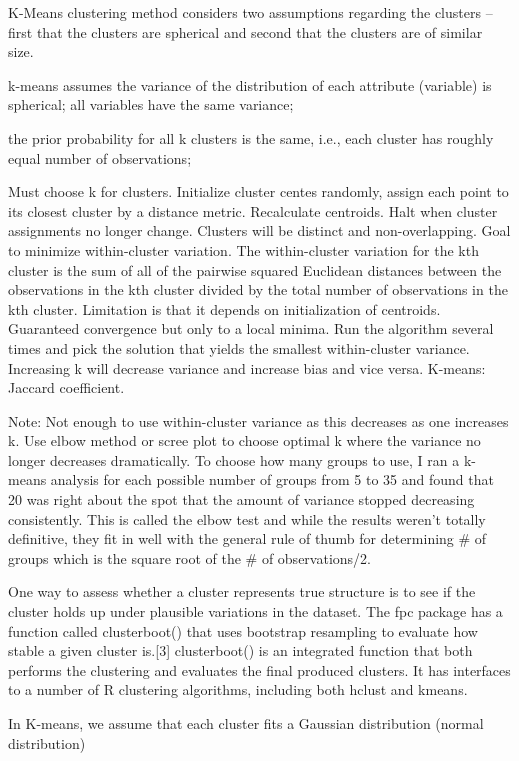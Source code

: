 \documentclass[]{book}
\theoremstyle{definition}
\theoremstyle{definition}
\theoremstyle{definition}
\theoremstyle{remark}
\begin{document}
K-Means clustering method considers two assumptions regarding the
clusters -- first that the clusters are spherical and second that the
clusters are of similar size.

k-means assumes the variance of the distribution of each attribute
(variable) is spherical; all variables have the same variance;

the prior probability for all k clusters is the same, i.e., each cluster
has roughly equal number of observations;

Must choose k for clusters. Initialize cluster centes randomly, assign
each point to its closest cluster by a distance metric. Recalculate
centroids. Halt when cluster assignments no longer change. Clusters will
be distinct and non-overlapping. Goal to minimize within-cluster
variation. The within-cluster variation for the kth cluster is the sum
of all of the pairwise squared Euclidean distances between the
observations in the kth cluster divided by the total number of
observations in the kth cluster. Limitation is that it depends on
initialization of centroids. Guaranteed convergence but only to a local
minima. Run the algorithm several times and pick the solution that
yields the smallest within-cluster variance. Increasing k will decrease
variance and increase bias and vice versa. K-means: Jaccard coefficient.

Note: Not enough to use within-cluster variance as this decreases as one
increases k. Use elbow method or scree plot to choose optimal k where
the variance no longer decreases dramatically. To choose how many groups
to use, I ran a k-means analysis for each possible number of groups from
5 to 35 and found that 20 was right about the spot that the amount of
variance stopped decreasing consistently. This is called the elbow test
and while the results weren't totally definitive, they fit in well with
the general rule of thumb for determining \# of groups which is the
square root of the \# of observations/2.

One way to assess whether a cluster represents true structure is to see
if the cluster holds up under plausible variations in the dataset. The
fpc package has a function called clusterboot() that uses bootstrap
resampling to evaluate how stable a given cluster is.{[}3{]}
clusterboot() is an integrated function that both performs the
clustering and evaluates the final produced clusters. It has interfaces
to a number of R clustering algorithms, including both hclust and
kmeans.

In K-means, we assume that each cluster fits a Gaussian distribution
(normal distribution)
\end{document}
